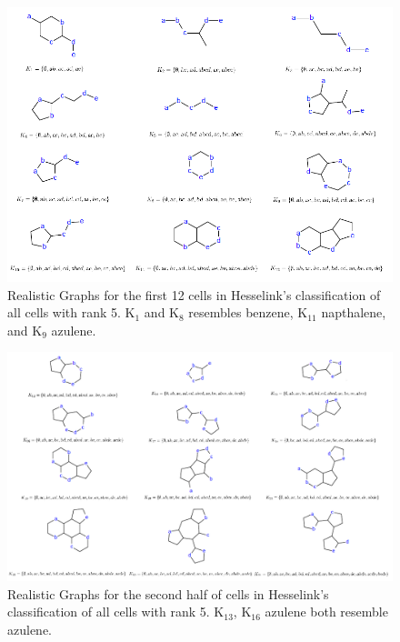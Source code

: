 \documentclass[12pt]{article}
\begin{document}
\begin{figure}[ht!]
\centering
\includegraphics[width=160mm]{rank5Results1.png}
\caption{Realistic Graphs for the first 12 cells in Hesselink's classification of all cells with rank 5. K$_1$ and K$_8$ resembles benzene, K$_{11}$ napthalene, and K$_9$ azulene.}
\label{fig:rank5Results1}
\end{figure}

\begin{figure}[ht!]
\centering
\includegraphics[width=160mm]{rank5Results2.png}
\caption{Realistic Graphs for the second half of cells in Hesselink's classification of all cells with rank 5. K$_{13}$, K$_{16}$ azulene both resemble azulene.}
\label{fig:rank5Results2}
\end{figure}
\end{document}
